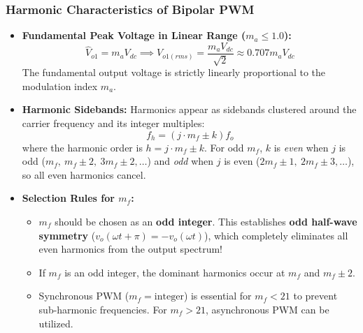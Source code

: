 \documentclass[11pt,a4paper]{article}
\begin{document}
\subsubsection{Harmonic Characteristics of Bipolar PWM}
\begin{itemize}[leftmargin=*]
  \item \textbf{Fundamental Peak Voltage in Linear Range ($m_a \le 1.0$):}
  \begin{equation}
  \hat{V}_{o1} = m_a V_{dc} \implies V_{o1(rms)} = \frac{m_a V_{dc}}{\sqrt{2}} \approx 0.707 m_a V_{dc}
  \end{equation}
  The fundamental output voltage is strictly linearly proportional to the modulation index $m_a$.
  \item \textbf{Harmonic Sidebands:} Harmonics appear as sidebands clustered around the carrier frequency and its integer multiples:
  \begin{equation}
  f_h = \left(j \cdot m_f \pm k\right) f_o
  \end{equation}
  where the harmonic order is $h = j \cdot m_f \pm k$. For odd $m_f$, $k$ is \emph{even} when $j$ is odd ($m_f,\ m_f\!\pm\!2,\ 3m_f\!\pm\!2,\dots$) and \emph{odd} when $j$ is even ($2m_f\!\pm\!1,\ 2m_f\!\pm\!3,\dots$), so all even harmonics cancel.
  \item \textbf{Selection Rules for $m_f$:}
  \begin{itemize}
    \item $m_f$ should be chosen as an \textbf{odd integer}. This establishes \textbf{odd half-wave symmetry} ($v_o(\omega t + \pi) = -v_o(\omega t)$), which completely eliminates all even harmonics from the output spectrum!
    \item If $m_f$ is an odd integer, the dominant harmonics occur at $m_f$ and $m_f \pm 2$.
    \item Synchronous PWM ($m_f = \text{integer}$) is essential for $m_f < 21$ to prevent sub-harmonic frequencies. For $m_f > 21$, asynchronous PWM can be utilized.
  \end{itemize}
\end{itemize}
\end{document}
